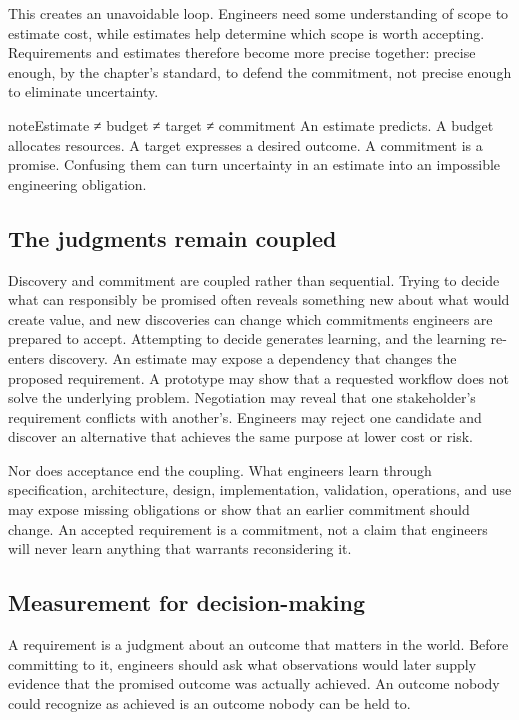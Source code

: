 This creates an unavoidable loop. Engineers need some understanding of scope to estimate cost, while
estimates help determine which scope is worth accepting. Requirements and estimates therefore become
more precise together: precise enough, by the chapter's standard, to defend the commitment, not
precise enough to eliminate uncertainty.

\begin{bookbox}{note}{Estimate ≠ budget ≠ target ≠ commitment} %
An estimate predicts. A budget allocates resources. A target expresses a desired outcome. A
commitment is a promise. Confusing them can turn uncertainty in an estimate into an impossible
engineering obligation.
\end{bookbox}

\subsection{The judgments remain coupled}\label{sec-judgments-coupled}

Discovery and commitment are coupled rather than sequential.
Trying to decide what can responsibly be promised often reveals something new about what would create value, and new discoveries can change which commitments engineers are prepared to accept.
Attempting to decide generates learning, and the learning re-enters discovery.
An estimate may expose a dependency that changes the proposed requirement.
A prototype may show that a requested workflow does not solve the underlying problem.
Negotiation may reveal that one stakeholder's requirement conflicts with another's.
Engineers may reject one candidate and discover an alternative that achieves the same purpose at lower cost or risk.

Nor does acceptance end the coupling.
What engineers learn through specification, architecture, design, implementation, validation, operations, and use may expose missing obligations or show that an earlier commitment should change.
An accepted requirement is a commitment, not a claim that engineers will never learn anything that warrants reconsidering it.

\subsection{Measurement for decision-making}\label{sec-measurement-requirements}

A requirement is a judgment about an outcome that matters in the world. Before committing to it,
engineers should ask what observations would later supply evidence that the promised outcome was
actually achieved. An outcome nobody could recognize as achieved is an outcome nobody can be held
to.

